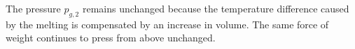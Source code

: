 The pressure \( p_{g,2} \) remains unchanged because the temperature difference caused by the melting is compensated by an increase in volume. The same force of weight continues to press from above unchanged.